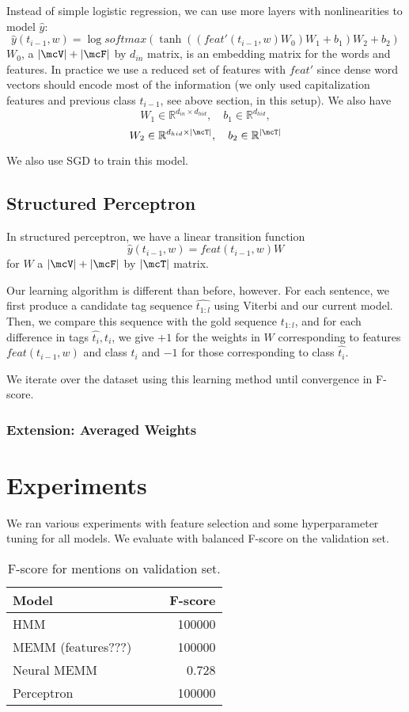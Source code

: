 \documentclass[11pt]{article}
\begin{document}
Instead of simple logistic regression, we can use more layers with nonlinearities to model $\widehat{y}$:
$$\widehat{y}(t_{i-1}, w) = \log softmax( \tanh((feat'(t_{i-1}, w)W_0)W_1 + b_1)W_2 + b_2)$$
$W_0$, a $|\mcV| + |\mcF|$ by $d_{in}$ matrix, is an embedding matrix for the words and features. In practice we use a reduced set of features with $feat'$ since dense word vectors should encode most of the information (we only used capitalization features and previous class $t_{i-1}$, see above section, in this setup). We also have
$$W_1 \in \mathbb{R}^{d_{in} \times d_{hid}}, \quad b_1 \in \mathbb{R}^{d_{hid}},$$
$$W_2 \in \mathbb{R}^{d_{hid} \times |\mcT|}, \quad b_2 \in \mathbb{R}^{|\mcT|}$$

We also use SGD to train this model.

\subsection{Structured Perceptron}

In structured perceptron, we have a linear transition function
$$\widehat{y}(t_{i-1}, w) = feat(t_{i-1}, w)W$$
for $W$ a $|\mcV| + |\mcF|$ by $|\mcT|$ matrix.

Our learning algorithm is different than before, however. For each sentence, we first produce a candidate tag sequence $\widehat{t_{1:l}}$ using Viterbi and our current model. Then, we compare this sequence with the gold sequence $t_{1:l}$, and for each difference in tags $\widehat{t_i}, t_i$, we give $+1$ for the weights in $W$ corresponding to features $feat(t_{i-1}, w)$ and class $t_i$ and $-1$ for those corresponding to class $\widehat{t_i}$.

We iterate over the dataset using this learning method until convergence in F-score.

\subsubsection{Extension: Averaged Weights}


\section{Experiments}

We ran various experiments with feature selection and some hyperparameter tuning for all models. We evaluate with balanced F-score on the validation set.

\begin{table}[h]
\centering
\begin{tabular}{lccr}
 \toprule
 Model &  &  & F-score \\
 \midrule
 HMM & & & 100000 \\
 MEMM (features???) & & & 100000 \\
 Neural MEMM & & & 0.728 \\
 Perceptron & & & 100000
\end{tabular}
\caption{\label{tab:results} F-score for mentions on validation set.}
\end{table}
\end{document}
